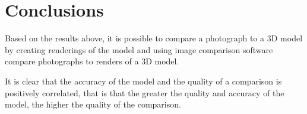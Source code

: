 \documentclass[11pt,a4paper]{report}
\begin{document}
	\section{Conclusions}
		Based on the results above, it is possible to compare a photograph to a 3D model by creating renderings of the model and using image comparison software compare photographs to renders of a 3D model.
		
		It is clear that the accuracy of the model and the quality of a comparison is positively correlated, that is that the greater the quality and accuracy of the model, the higher the quality of the comparison.
		
\newpage

{}
\end{document}
